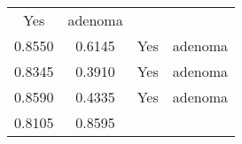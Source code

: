 \documentclass[12pt,]{article}
\begin{document}
\begin{longtable}[]{@{}cccc@{}}
\begin{minipage}[t]{0.22\columnwidth}
Yes\strut
\end{minipage} & \begin{minipage}[t]{0.16\columnwidth}\centering\strut
adenoma\strut
\end{minipage}\tabularnewline
\begin{minipage}[t]{0.24\columnwidth}\centering\strut
0.8550\strut
\end{minipage} & \begin{minipage}[t]{0.26\columnwidth}\centering\strut
0.6145\strut
\end{minipage} & \begin{minipage}[t]{0.22\columnwidth}\centering\strut
Yes\strut
\end{minipage} & \begin{minipage}[t]{0.16\columnwidth}\centering\strut
adenoma\strut
\end{minipage}\tabularnewline
\begin{minipage}[t]{0.24\columnwidth}\centering\strut
0.8345\strut
\end{minipage} & \begin{minipage}[t]{0.26\columnwidth}\centering\strut
0.3910\strut
\end{minipage} & \begin{minipage}[t]{0.22\columnwidth}\centering\strut
Yes\strut
\end{minipage} & \begin{minipage}[t]{0.16\columnwidth}\centering\strut
adenoma\strut
\end{minipage}\tabularnewline
\begin{minipage}[t]{0.24\columnwidth}\centering\strut
0.8590\strut
\end{minipage} & \begin{minipage}[t]{0.26\columnwidth}\centering\strut
0.4335\strut
\end{minipage} & \begin{minipage}[t]{0.22\columnwidth}\centering\strut
Yes\strut
\end{minipage} & \begin{minipage}[t]{0.16\columnwidth}\centering\strut
adenoma\strut
\end{minipage}\tabularnewline
\begin{minipage}[t]{0.24\columnwidth}\centering\strut
0.8105\strut
\end{minipage} & \begin{minipage}[t]{0.26\columnwidth}\centering\strut
0.8595\strut
\end{minipage} & \begin{minipage}[t]{0.22\columnwidth}\centering\strut

\end{minipage}
\end{longtable}
\end{document}
